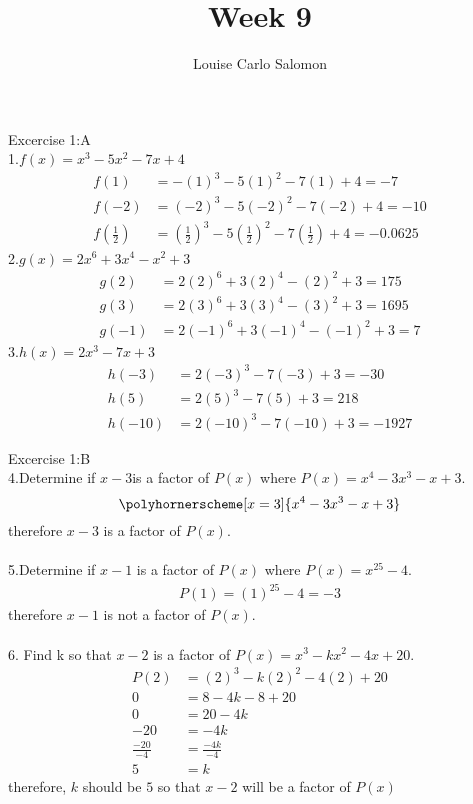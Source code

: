 \documentclass{article}
\title{Week 9}
\author{Louise Carlo Salomon}
\date{}
\begin{document}
    \maketitle
    Excercise 1:A\\
        1.$f(x)=x^3-5x^2-7x+4$
            \begin{align*}
                f(1)           & = -(1)^3-5(1)^2-7(1)+4=-7 \\
                f(-2)          & = (-2)^3-5(-2)^2-7(-2)+4=-10 \\
                f(\frac{1}{2}) & = (\frac{1}{2})^3-5(\frac{1}{2})^2-7(\frac{1}{2})+4=-0.0625
            \end{align*}
        2.$g(x)=2x^6+3x^4-x^2+3$
            \begin{align*}
                g(2)&=2(2)^6+3(2)^4-(2)^2+3=175\\
                g(3)&=2(3)^6+3(3)^4-(3)^2+3=1695\\
                g(-1)&=2(-1)^6+3(-1)^4-(-1)^2+3=7
            \end{align*}
        3.$h(x)=2x^3-7x+3$
            \begin{align*}
                h(-3)&=2(-3)^3-7(-3)+3=-30\\
                h(5)&=2(5)^3-7(5)+3=218\\
                h(-10)&=2(-10)^3-7(-10)+3=-1927
            \end{align*}
    \par Excercise 1:B\\
        4.Determine if $x-3$is a factor of $P(x)$ where $P(x)=x^4-3x^3-x+3$.
        \begin{equation}
            \polyhornerscheme[x=3]{x^4-3x^3-x+3}
        \end{equation}
        therefore $x-3$ is a factor of $P(x)$.\\\\
        5.Determine if $x-1$ is a factor of $P(x)$ where $P(x)=x^{25}-4$.
        \begin{align*}
                P(1)=(1)^{25}-4=-3
        \end{align*}
        therefore $x-1$ is not a factor of $P(x)$.\\\\
        6. Find k so that $x-2$ is a factor of $P(x)=x^3-kx^2-4x+20$.
        \begin{align*}
                P(2)&=(2)^3-k(2)^2-4(2)+20\\
                   0&=8-4k-8+20\\
                   0&=20-4k\\
                 -20&=-4k\\
                 \frac{-20}{-4}&=\frac{-4k}{-4}\\
                 5&=k
        \end{align*}
        therefore, $k$ should be $5$ so that $x-2$ will be a factor of $P(x)$
    
\end{document}
